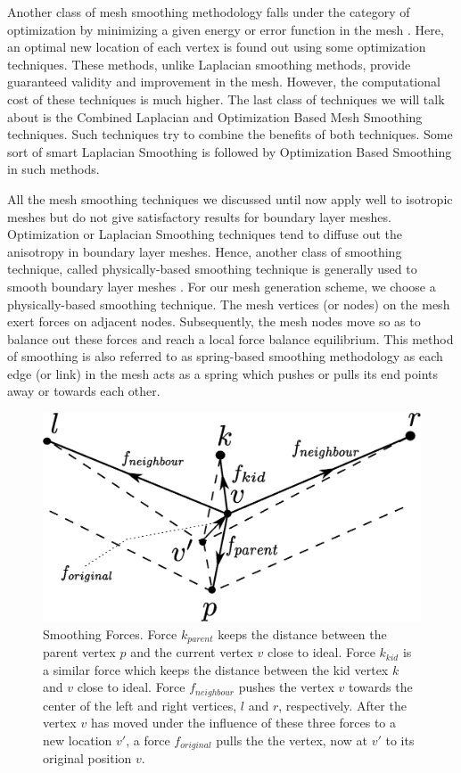 Another class of mesh smoothing methodology falls under the category of optimization by minimizing a given energy or error function in the mesh \cite{freitag1997tetrahedral, zhou2000angle, chen2004mesh, parthasarathy1991constrained, shephard1991automatic}. Here, an optimal new location of each vertex is found out using some optimization techniques. These methods, unlike Laplacian smoothing methods, provide guaranteed validity and improvement in the mesh. However, the computational cost of these techniques is much higher. The last class of techniques we will talk about is the Combined Laplacian and Optimization Based Mesh Smoothing techniques\cite{freitag1997combining, canann1998approach}. Such techniques try to combine the benefits of both techniques. Some sort of smart Laplacian Smoothing is followed by Optimization Based Smoothing in such methods.

All the mesh smoothing techniques we discussed until now apply well to isotropic meshes but do not give satisfactory results for boundary layer meshes. Optimization or Laplacian Smoothing techniques tend to diffuse out the anisotropy in boundary layer meshes. Hence, another class of smoothing technique, called physically-based smoothing technique is generally used to smooth boundary layer meshes \cite{numerow2017mixed, liu2016automatic, xu2006angle, lin2014vertex}. For our mesh generation scheme, we choose a physically-based smoothing technique. The mesh vertices (or nodes) on the mesh exert forces on adjacent nodes. Subsequently, the mesh nodes move so as to balance out these forces and reach a local force balance equilibrium. This method of smoothing is also referred to as spring-based smoothing methodology as each edge (or link) in the mesh acts as a spring which pushes or pulls its end points away or towards each other.

\begin{figure}
\centering
\includegraphics[width=0.7\linewidth]{img/m2/smoothing/smoothing.eps}
\caption[Smoothing force components on a vertex.]{Smoothing Forces. Force $k_{parent}$ keeps the distance between the parent vertex $p$ and the current vertex $v$ close to ideal. Force $k_{kid}$ is a similar force which keeps the distance between the kid vertex $k$ and $v$ close to ideal. Force $f_{neighbour}$ pushes the vertex $v$ towards the center of the left and right vertices, $l$ and $r$, respectively. After the vertex $v$ has moved under the influence of these three forces to a new location $v'$, a force $f_{original}$ pulls the the vertex, now at $v'$ to its original position $v$.}
\label{smoothingForces}
\end{figure}

